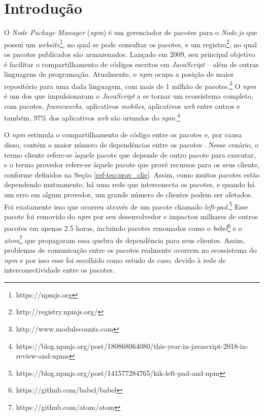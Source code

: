 \chapter{Introdução}
\label{cap:introducao}

O \textit{Node Package Manager} (\textit{npm}) é um gerenciador de pacotes para o \textit{Node.js} que possui um \textit{website}\footnote{https://npmjs.org}, no qual se pode consultar os pacotes, e um registro\footnote{http://registry.npmjs.org/}, no qual os pacotes publicados são armazenados. Lançado em 2009, seu principal objetivo é facilitar o compartilhamento de códigos escritos em \textit{JavaScript} -- além de outras linguagens de programação. Atualmente, o \textit{npm} ocupa a posição de maior repositório para uma dada linguagem, com mais de 1 milhão de pacotes.\footnote{http://www.modulecounts.com} O \textit{npm} é um dos que impulsionaram o \textit{JavaScript} a se tornar um ecossistema completo, com pacotes, \textit{frameworks}, aplicativos \textit{mobiles}, aplicativos \textit{web} entre outros \cite{introduction:npm} e também,  97\% dos aplicativos \textit{web} são oriundos do \textit{npm}.\footnote{https://blog.npmjs.org/post/180868064080/this-year-in-javascript-2018-in-review-and-npms}

O \textit{npm} estimula o compartilhamento de código entre os pacotes e, por causa disso, contém o maior número de dependências entre os pacotes \cite{teorical_reference:npm_2}. Nesse cenário, o termo cliente refere-se àquele pacote que depende de outro pacote para executar, e o termo provedor refere-se àquele pacote que provê recursos para os seus cliente, conforme definidos na Seção \ref{ref-teo:prov_clie}. Assim, como muitos pacotes estão dependendo mutuamente, há uma rede que interconecta os pacotes, e quando há um erro em algum provedor, um grande número de clientes podem ser afetados. Foi exatamente isso que ocorreu através de um pacote chamado \textit{left-pad}.\footnote{https://blog.npmjs.org/post/141577284765/kik-left-pad-and-npm} Esse pacote foi removido do \textit{npm} por seu desenvolvedor e impactou milhares de outros pacotes em apenas 2.5 horas, incluindo pacotes renomados como o \textit{babel}\footnote{https://github.com/babel/babel} e o \textit{atom}\footnote{https://github.com/atom/atom} que propagaram essa quebra de dependência para seus clientes. Assim, problemas de comunicação entre os pacotes realmente ocorrem no ecossistema do \textit{npm} e por isso esse foi escolhido como estudo de caso, devido à rede de interconectividade entre os pacotes.


